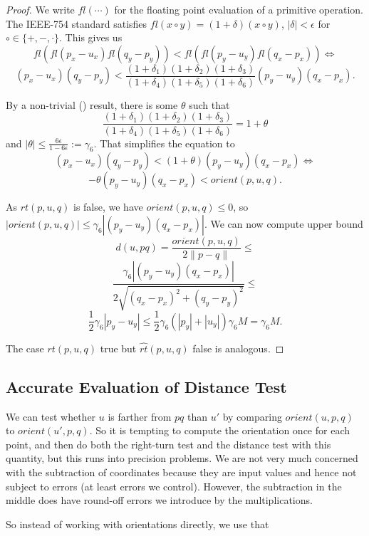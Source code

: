 \begin{proof}
    We write $fl(\cdots)$ for the floating point evaluation of a primitive 
    operation. The IEEE-754 standard satisfies
    $fl(x \circ y) = (1 + \delta)(x \circ y)$, $|\delta| < \epsilon$ for
    $\circ \in \{+, -, \cdot\}$. This gives us
    $$fl(fl(p_x - u_x) fl(q_y - p_y)) < 
            fl(fl(p_y - u_y) fl(q_x - p_x)) \iff$$
    $$(p_x - u_x) (q_y - p_y) < \frac{(1 + \delta_1)(1 + \delta_2)(1 + \delta_3)}
    {(1 + \delta_4)(1 + \delta_5)(1 + \delta_6)} (p_y - u_y) (q_x - p_x).$$

    By a non-trivial () result, there is some $\theta$
    such that
    $$\frac{(1 + \delta_1)(1 + \delta_2)(1 + \delta_3)}{(1 + \delta_4)(1 + \delta_5)(1 + \delta_6)} = 1 + \theta$$
    and $|\theta| \leq \frac{6\epsilon}{1 - 6\epsilon} := \gamma_6$.
    That simplifies the equation to
    $$(p_x - u_x) (q_y - p_y) < (1 + \theta) (p_y - u_y) (q_x - p_x) \iff$$
    $$-\theta (p_y - u_y) (q_x - p_x) < orient(p, u, q).$$

    As $rt(p, u, q)$ is false, we have $orient(p, u, q) \leq 0$, so
    $|orient(p, u, q)| \leq \gamma_6 |(p_y - u_y) (q_x - p_x)|$.
    We can now compute upper bound
    $$d(u, pq) = \frac{orient(p, u, q)}{2 \lVert p - q \rVert} \leq$$
    $$\frac{\gamma_6 |(p_y - u_y) (q_x - p_x)|}{2 \sqrt{(q_x - p_x)^2 + (q_y - p_y)^2}} \leq$$
    $$\frac{1}{2}\gamma_6 |p_y - u_y| \leq 
            \frac{1}{2} \gamma_6 (|p_y| + |u_y|)\gamma_6 M = \gamma_6 M.$$

    The case $rt(p, u, q)$ true but $\hat{rt}(p, u, q)$ false is analogous.
\end{proof}

\subsection{Accurate Evaluation of Distance Test}

We can test whether $u$ is farther from $pq$ than $u'$ by comparing
$orient(u, p, q)$ to $orient(u', p, q)$. So it
is tempting to compute the orientation once for each point, and then do both
the right-turn test and the distance test with this quantity, but this
runs into precision problems. We are not very much concerned with the
subtraction of coordinates because they are input values and hence not
subject to errors (at least errors we control). However, the subtraction 
in the middle does have round-off errors we introduce by the multiplications.

So instead of working with orientations directly, we use that

